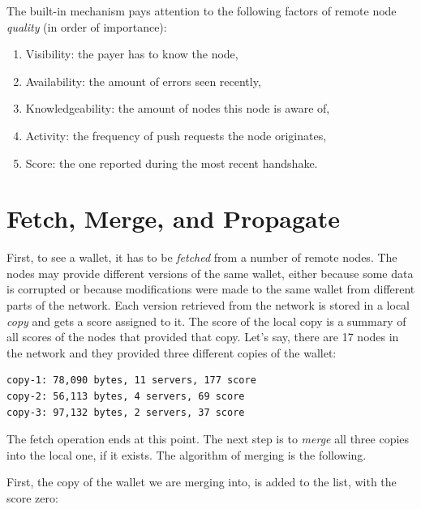 \documentclass[11pt,oneside]{article}
\begin{document}
The built-in mechanism pays attention to the following factors of
remote node \emph{quality} (in order of importance):

\begin{enumerate}
  \item Visibility: the payer has to know the node,
  \item Availability: the amount of errors seen recently,
  \item Knowledgeability: the amount of nodes this node is aware of,
  \item Activity: the frequency of push requests the node originates,
  \item Score: the one reported during the most recent handshake.
\end{enumerate}

\section{Fetch, Merge, and Propagate}

First, to see a wallet, it has to be \emph{fetched} from a number of remote
nodes. The nodes may provide different versions of the same wallet, either
because some data is corrupted or because modifications were made to the same
wallet from different parts of the network. Each version retrieved from the
network is stored in a local \emph{copy} and gets a score assigned to it.
The score of the local copy is a summary of all scores of the nodes that
provided that copy. Let's say, there are 17 nodes in the network and they
provided three different copies of the wallet:

\begin{verbatim}
copy-1: 78,090 bytes, 11 servers, 177 score
copy-2: 56,113 bytes, 4 servers, 69 score
copy-3: 97,132 bytes, 2 servers, 37 score
\end{verbatim}

The fetch operation ends at this point. The next step is to \emph{merge}
all three copies into the local one, if it exists. The algorithm of merging
is the following.

First, the copy of the wallet we are merging into, is added to the list,
with the score zero:
\end{document}
